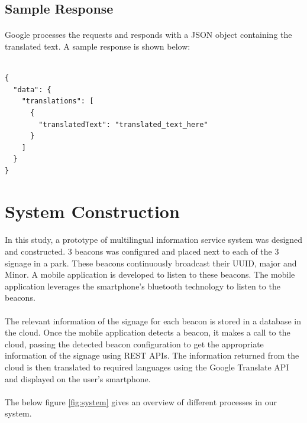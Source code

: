 \documentclass[12pt]{article}
\begin{document}
\subsection{Sample Response}

\paragraph{} Google processes the requests and responds with a JSON object containing the translated text. A sample response is shown below:

\begin{lstlisting}

{
  "data": {
    "translations": [
      {
        "translatedText": "translated_text_here"
      }
    ]
  }
}
\end{lstlisting}



\section{System Construction}
\label{system}
\paragraph{}In this study, a prototype of multilingual information service system was designed and constructed. 3 beacons was configured and placed next to each of the 3 signage in a park. These beacons continuously broadcast their UUID, major and Minor. A mobile application is developed to listen to these beacons. The mobile application leverages the smartphone’s bluetooth technology to listen to the beacons.

\paragraph{}The relevant information of the signage for each beacon is stored in a database in the cloud. Once the mobile application detects a beacon, it makes a call to the cloud, passing the detected beacon configuration to get the appropriate information of the signage using REST APIs. The information returned from the cloud is then translated to required languages using the Google Translate API and displayed on the user’s smartphone.

\paragraph{}The below figure \ref{fig:system} gives an overview of different processes in our system.
\end{document}
